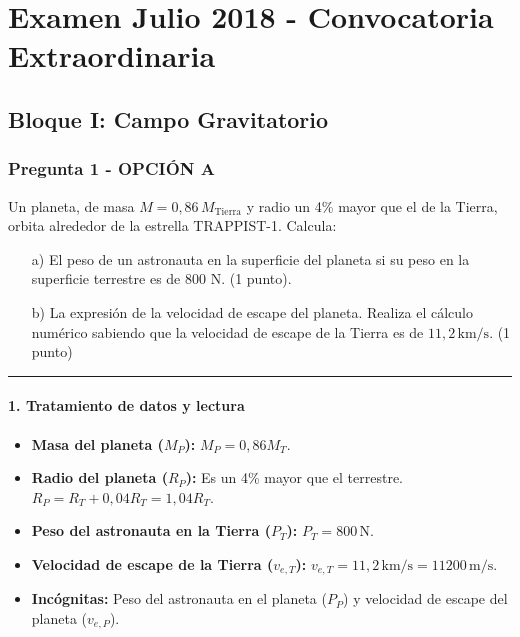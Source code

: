 \chapter{Examen Julio 2018 - Convocatoria Extraordinaria}
\label{chap:2018_jul_ext}

\section{Bloque I: Campo Gravitatorio}
\label{sec:grav_2018_jul_ext}

\subsection{Pregunta 1 - OPCIÓN A}
\label{subsec:1A_2018_jul_ext}

\begin{cajaenunciado}
Un planeta, de masa $M=0,86\,M_{\text{Tierra}}$ y radio un 4\% mayor que el de la Tierra, orbita alrededor de la estrella TRAPPIST-1. Calcula:
\begin{enumerate}
    \item[a)] El peso de un astronauta en la superficie del planeta si su peso en la superficie terrestre es de 800 N. (1 punto).
    \item[b)] La expresión de la velocidad de escape del planeta. Realiza el cálculo numérico sabiendo que la velocidad de escape de la Tierra es de $11,2\,\text{km/s}$. (1 punto)
\end{enumerate}
\end{cajaenunciado}
\hrule

\subsubsection*{1. Tratamiento de datos y lectura}
\begin{itemize}
    \item \textbf{Masa del planeta ($M_P$):} $M_P = 0,86 M_T$.
    \item \textbf{Radio del planeta ($R_P$):} Es un 4\% mayor que el terrestre. $R_P = R_T + 0,04 R_T = 1,04 R_T$.
    \item \textbf{Peso del astronauta en la Tierra ($P_T$):} $P_T = 800\,\text{N}$.
    \item \textbf{Velocidad de escape de la Tierra ($v_{e,T}$):} $v_{e,T} = 11,2\,\text{km/s} = 11200\,\text{m/s}$.
    \item \textbf{Incógnitas:} Peso del astronauta en el planeta ($P_P$) y velocidad de escape del planeta ($v_{e,P}$).
\end{itemize}


